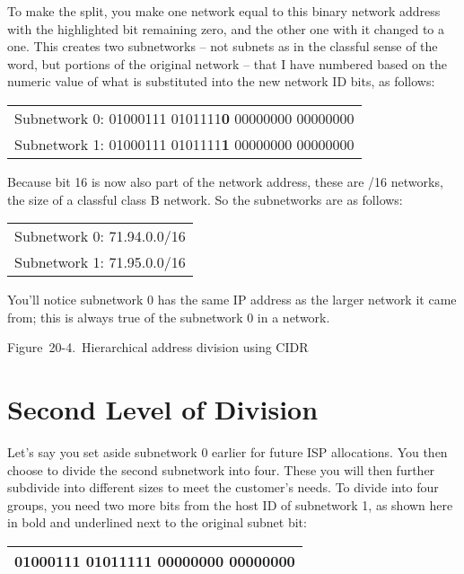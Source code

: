 To make the split, you make one network equal to this binary network
address with the highlighted bit remaining zero, and the other one with
it changed to a one. This creates two subnetworks -- not subnets as in
the classful sense of the word, but portions of the original
network -- that I have numbered based on the numeric value of what is
substituted into the new network ID bits, as follows:

\begin{longtable}[]{@{}l@{}}
\toprule
\endhead
Subnetwork 0: 01000111 0101111{\textbf{0}} 00000000
00000000\tabularnewline
Subnetwork 1: 01000111 0101111{\textbf{1}} 00000000
00000000\tabularnewline
\bottomrule
\end{longtable}

Because bit 16 is now also part of the network address, these are /16
networks, the size of a classful class B network. So the subnetworks are
as follows:

\begin{longtable}[]{@{}l@{}}
\toprule
\endhead
Subnetwork 0: 71.94.0.0/16\tabularnewline
Subnetwork 1: 71.95.0.0/16\tabularnewline
\bottomrule
\end{longtable}

You'll notice subnetwork 0 has the same IP address as the larger network
it came from; this is always true of the subnetwork 0 in a network.





Figure~20-4.~Hierarchical address division using CIDR

\section{Second Level of Division}

Let's say you set aside subnetwork 0 earlier for future ISP allocations.
You then choose to divide the second subnetwork into four. These you
will then further subdivide into different sizes to meet the customer's
needs. To divide into four groups, you need two more bits from the host
ID of subnetwork 1, as shown here in bold and underlined next to the
original subnet bit:

\begin{longtable}[]{@{}l@{}}
\toprule
\endhead
01000111 0101111{\textbf{1 {00}}}000000 00000000\tabularnewline
\bottomrule
\end{longtable}

